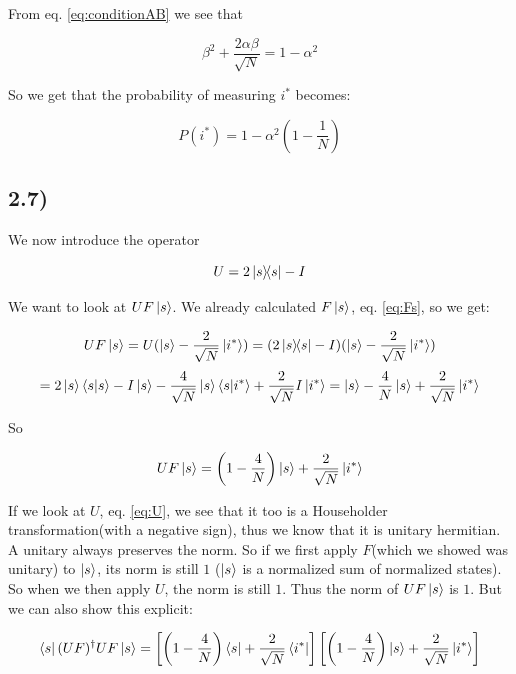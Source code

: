 \documentclass[a4paper,norsk, 10pt]{article}
\begin{document}
From eq. \eqref{eq:conditionAB} we see that

\begin{equation}
\beta^2 + \frac{2\alpha \beta}{\sqrt{N}}  = 1 - \alpha^2
\end{equation}

So we get that the probability of measuring $i^*$ becomes:

\begin{equation}
P(i^*) = 1 - \alpha^2\left(1 - \frac{1}{N}\right)
\label{eq:prob}
\end{equation}

\subsection{2.7)}

We now introduce the operator

\begin{equation}
U = 2\ketbra{s}{s} - I
\label{eq:U}
\end{equation}

We want to look at $UF\ket{s}$. We already calculated $F\ket{s}$, eq. \eqref{eq:Fs}, so we get: 

\begin{equation}
UF\ket{s} = U(\ket{s} - \frac{2}{\sqrt{N}}\ket{i^*}) = (2\ketbra{s}{s} - I)(\ket{s} - \frac{2}{\sqrt{N}}\ket{i^*})
\end{equation}
\begin{equation}
= 2\ket{s}\braket{s}{s} - I\ket{s} - \frac{4}{\sqrt{N}}\ket{s}\braket{s}{i^*} + \frac{2}{\sqrt{N}}I\ket{i^*} = \ket{s} - \frac{4}{N}\ket{s} + \frac{2}{\sqrt{N}}\ket{i^*} 
\end{equation}

So

\begin{equation}
UF\ket{s} =  \left(1 - \frac{4}{N}\right)\ket{s} + \frac{2}{\sqrt{N}}\ket{i^*} 
\label{eq:UFs}
\end{equation}


If we look at $U$, eq. \eqref{eq:U}, we see that it too is a Householder transformation(with a negative sign), thus we know that it is unitary hermitian. A unitary always preserves the norm. So if we first apply $F$(which we showed was unitary) to $\ket{s}$, its norm is still $1$ ($\ket{s}$ is a normalized sum of normalized states). So when we then apply $U$, the norm is still $1$. Thus the norm of $UF\ket{s}$ is $1$. But we can also show this explicit:

\begin{equation}
\bra{s}(UF)^\dagger UF\ket{s}=
\left[\left(1 - \frac{4}{N}\right)\bra{s} + \frac{2}{\sqrt{N}}\bra{i^*}\right]\left[\left(1 - \frac{4}{N}\right)\ket{s} + \frac{2}{\sqrt{N}}\ket{i^*}\right]
\end{equation}
\end{document}
